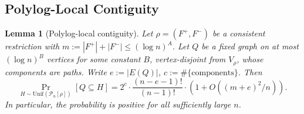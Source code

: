 \documentclass[11pt]{article}
\newtheorem{lemma}[theorem]{Lemma}
\begin{document}
\subsection{Polylog-Local Contiguity}

\begin{lemma}[Polylog-local contiguity]
\label{lem:polylog-local-contiguity}
Let $\rho = (F^+, F^-)$ be a consistent restriction with
$m := |F^+| + |F^-| \le (\log n)^A$.
Let $Q$ be a fixed graph on at most $(\log n)^B$ vertices for some
constant $B$, vertex-disjoint from $V_\rho$, whose components are paths.
Write $e := |E(Q)|$, $c := \#\{\text{components}\}$.
Then
\[
\Pr_{H \sim \mathrm{Unif}(\mathcal{P}_n[\rho])}[Q \subseteq H]
= 2^c \cdot \frac{(n-e-1)!}{(n-1)!} \cdot (1 + O((m+e)^2/n)).
\]
In particular, the probability is positive for all sufficiently large $n$.
\end{lemma}
\end{document}
